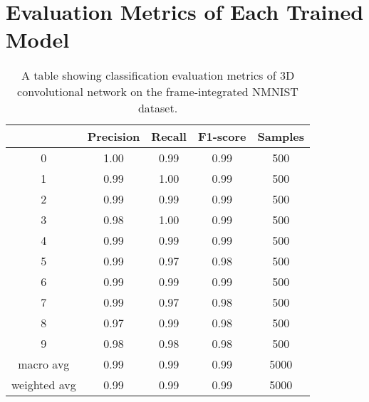 \chapter{Evaluation Metrics of Each Trained Model}

\begin{table}[htb]
    \centering
    \begin{tabular}{|| c | c | c | c | c ||}
        \hline
             & Precision & Recall & F1-score & Samples \\
        \hline \hline
        0            & 1.00 & 0.99 & 0.99 & 500  \\
        \hline
        1            & 0.99 & 1.00 & 0.99 & 500  \\
        \hline
        2            & 0.99 & 0.99 & 0.99 & 500  \\
        \hline
        3            & 0.98 & 1.00 & 0.99 & 500  \\
        \hline
        4            & 0.99 & 0.99 & 0.99 & 500  \\
        \hline
        5            & 0.99 & 0.97 & 0.98 & 500  \\
        \hline
        6            & 0.99 & 0.99 & 0.99 & 500  \\
        \hline
        7            & 0.99 & 0.97 & 0.98 & 500  \\
        \hline
        8            & 0.97 & 0.99 & 0.98 & 500  \\
        \hline
        9            & 0.98 & 0.98 & 0.98 & 500  \\
        \hline
        macro avg    & 0.99 & 0.99 & 0.99 & 5000 \\
        \hline
        weighted avg & 0.99 & 0.99 & 0.99 & 5000 \\
        \hline
    \end{tabular}
    \caption{A table showing classification evaluation metrics of 3D convolutional network on the frame-integrated NMNIST dataset.}
    \label{tab:conv3d_nmnist_evaluation_metrics}
\end{table}

